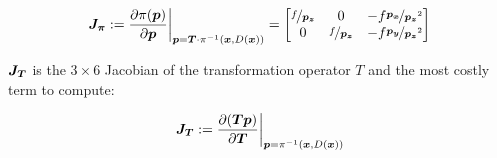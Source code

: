\begin{equation}
    \mat{J_{\pi}} := \frac{\partial \pi(\vec{p})}{\partial \vec{p}}
    \bigg|_{\vec{p} = \vec{T}\cdot\pi^{-1}(\vec{x},D(\vec{x}))}
    =
    \begin{bmatrix}
        \nicefrac{f}{\vec{p_z}} & 0 & -f \nicefrac{\vec{p_x}}{\vec{p_z}^2} \\
        0 & \nicefrac{f}{\vec{p_z}} & -f \nicefrac{\vec{p_y}}{\vec{p_z}^2}
    \end{bmatrix}
\end{equation}

$\mat{J_T}$ is the $3 \times 6$ Jacobian of the transformation operator $T$ and
the most costly term to compute:

\begin{equation}
    \mat{J_T} := \frac{\partial (\vec{T} \vec{p})}{\partial \vec{T}}
    \bigg|_{\vec{p} = \pi^{-1}(\vec{x}, D(\vec{x}))}
\end{equation}
